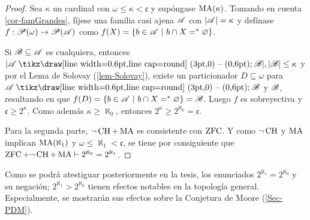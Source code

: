 \begin{proof}
	Sea $\kappa$ un cardinal con $\omega \leq \kappa <\mathfrak{c}$ y supóngase $\operatorname{MA}(\kappa)$. Tomando en cuenta \ref{cor-famGrandes}, fíjese una familia casi ajena $\mathscr{A}$ con $|\mathscr{A}|=\kappa$ y defínase $f:\mathscr{P}(\omega) \to \mathscr{P}(\mathscr{A})$ como $ f(X)=\{ b \in \mathscr{A} \text{ $|$ } b \cap X =^* \varnothing \} $.

	Si $\mathscr{B} \subseteq \mathscr{A}$ es cualquiera, entonces $|\ms{A} \setminus \ms{B}|, |\ms{B}| \leq \kappa$ y por el Lema de Solovay (\ref{lem-Solovay}), existe un particionador $D \subseteq \omega$ para $\ms{A} \setminus \ms{B}$ y $\mathscr{B}$, resultando en que $ f(D)=\{b \in \mathscr{A} \text{ $|$ } b \cap X =^* \varnothing \} = \mathscr{B} $. Luego $f$ es sobreyectiva y $\mathfrak{c} \geq 2^\kappa $. Como además $\kappa \geq \aleph_0$, entonces $2^\kappa \geq 2^{\aleph_0}=\mathfrak{c}$.

	Para la segunda parte, $\lnot \operatorname{CH} + \operatorname{MA}$ es consistente con $\operatorname{ZFC}$. Y como $\lnot \operatorname{CH}$ y $\operatorname{MA}$ implican $\operatorname{MA}(\aleph_1)$ y $\omega \leq \aleph_1 < \mathfrak{c}$, se tiene por consiguiente que $\operatorname{ZFC}+\lnot \operatorname{CH} + \operatorname{MA} \vdash 2^{\aleph_0}=2^{\aleph_1}$.
\end{proof}

Como se podrá atestiguar posteriormente en la tesis, los enunciados $2^{\aleph_1} = 2^{\aleph_0}$ y su negación; $2^{\aleph_1} > 2^{\aleph_0}$ tienen efectos notables en la topología general. Especialmente, se mostrarán sus efectos sobre la Conjetura de Moore (\autoref{Sec-PDM}).
